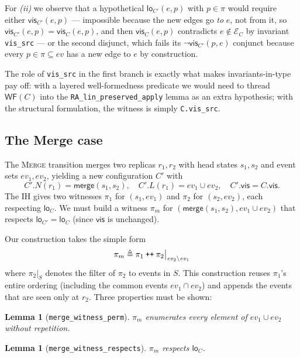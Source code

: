 \documentclass[11pt,a4paper]{article}
\newtheorem{lemma}[theorem]{Lemma}
\theoremstyle{definition}
\theoremstyle{remark}
\newcommand{\mmerge}{\mathsf{merge}}
\newcommand{\mvis}{\mathsf{vis}}
\newcommand{\mlo}{\mathsf{lo}}
\newcommand{\ev}{\mathit{ev}}
\newcommand{\evs}{\mathcal{E}}
\newcommand{\wellformed}{\mathsf{WF}}
\begin{document}
For \emph{(ii)} we observe that a hypothetical $\mlo_{C'}(e, p)$ with
$p \in \pi$ would require either $\mvis_{C'}(e, p)$ --- impossible
because the new edges go \emph{to} $e$, not from it, so
$\mvis_{C'}(e, p) = \mvis_C(e, p)$, and then $\mvis_C(e, p)$
contradicts $e \notin \evs_C$ by invariant \texttt{vis\_src} --- or
the second disjunct, which fails its $\neg\mvis_{C'}(p, e)$ conjunct
because every $p \in \pi \subseteq \ev$ has a new edge to $e$ by
construction.

The role of \texttt{vis\_src} in the first branch is exactly what
makes invariants-in-type pay off: with a layered well-formedness
predicate we would need to thread $\wellformed(C)$ into the
\texttt{RA\_lin\_preserved\_apply} lemma as an extra hypothesis;
with the structural formulation, the witness is simply
\texttt{C.vis\_src}.

\subsection{The Merge case}
\label{sec:bridge-merge}

The \textsc{Merge} transition merges two replicas $r_1, r_2$ with
head states $s_1, s_2$ and event sets $\ev_1, \ev_2$, yielding a new
configuration $C'$ with
\[
  C'.N(r_1) = \mmerge(s_1, s_2), \quad C'.L(r_1) = \ev_1 \cup \ev_2, \quad C'.\mvis = C.\mvis.
\]
The IH gives two witnesses $\pi_1$ for $(s_1, \ev_1)$ and $\pi_2$
for $(s_2, \ev_2)$, each respecting $\mlo_C$. We must build a
witness $\pi_m$ for $(\mmerge(s_1, s_2), \ev_1 \cup \ev_2)$ that
respects $\mlo_{C'} = \mlo_C$ (since $\mvis$ is unchanged).

Our construction takes the simple form
\begin{equation}
\label{eq:merge-witness}
  \pi_m \triangleq \pi_1 \mathbin{\text{\tt ++}} \pi_2\big|_{\ev_2 \setminus \ev_1}
\end{equation}
where $\pi_2\big|_S$ denotes the filter of $\pi_2$ to events in $S$.
This construction reuses $\pi_1$'s entire ordering (including the
common events $\ev_1 \cap \ev_2$) and appends the events that are
seen only at $r_2$. Three properties must be shown:

\begin{lemma}[\texttt{merge\_witness\_perm}]
\label{lem:merge-perm}
$\pi_m$ enumerates every element of $\ev_1 \cup \ev_2$ without
repetition.
\end{lemma}

\begin{lemma}[\texttt{merge\_witness\_respects}]
\label{lem:merge-respects}
$\pi_m$ respects $\mlo_C$.
\end{lemma}
\end{document}

